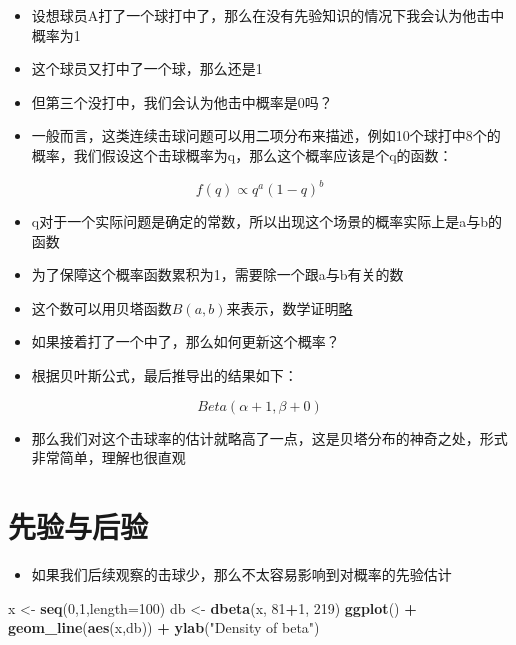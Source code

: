 \documentclass[]{book}
\newenvironment{Shaded}{\begin{snugshade}}{\end{snugshade}}
\newcommand{\DataTypeTok}[1]{\textcolor[rgb]{0.13,0.29,0.53}{#1}}
\newcommand{\DecValTok}[1]{\textcolor[rgb]{0.00,0.00,0.81}{#1}}
\newcommand{\KeywordTok}[1]{\textcolor[rgb]{0.13,0.29,0.53}{\textbf{#1}}}
\newcommand{\NormalTok}[1]{#1}
\newcommand{\OperatorTok}[1]{\textcolor[rgb]{0.81,0.36,0.00}{\textbf{#1}}}
\newcommand{\StringTok}[1]{\textcolor[rgb]{0.31,0.60,0.02}{#1}}
\providecommand{\tightlist}{%
  \setlength{\itemsep}{0pt}\setlength{\parskip}{0pt}}
\begin{document}
\begin{itemize}
\tightlist
\item
  设想球员A打了一个球打中了，那么在没有先验知识的情况下我会认为他击中概率为1
\item
  这个球员又打中了一个球，那么还是1
\item
  但第三个没打中，我们会认为他击中概率是0吗？
\item
  一般而言，这类连续击球问题可以用二项分布来描述，例如10个球打中8个的概率，我们假设这个击球概率为q，那么这个概率应该是个q的函数：
\end{itemize}

\[f(q) \propto q^a(1-q)^b\]

\begin{itemize}
\tightlist
\item
  q对于一个实际问题是确定的常数，所以出现这个场景的概率实际上是a与b的函数
\item
  为了保障这个概率函数累积为1，需要除一个跟a与b有关的数
\item
  这个数可以用贝塔函数\(B(a,b)\)来表示，数学证明\href{https://en.wikipedia.org/wiki/Conjugate_prior\#Example}{略}
\item
  如果接着打了一个中了，那么如何更新这个概率？
\item
  根据贝叶斯公式，最后推导出的结果如下：
\end{itemize}

\[Beta(\alpha+1,\beta+0)\]

\begin{itemize}
\tightlist
\item
  那么我们对这个击球率的估计就略高了一点，这是贝塔分布的神奇之处，形式非常简单，理解也很直观
\end{itemize}

\hypertarget{ux5148ux9a8cux4e0eux540eux9a8c}{%
\section{先验与后验}\label{ux5148ux9a8cux4e0eux540eux9a8c}}

\begin{itemize}
\tightlist
\item
  如果我们后续观察的击球少，那么不太容易影响到对概率的先验估计
\end{itemize}

\begin{Shaded}
\begin{Highlighting}[]
\NormalTok{x <-}\StringTok{ }\KeywordTok{seq}\NormalTok{(}\DecValTok{0}\NormalTok{,}\DecValTok{1}\NormalTok{,}\DataTypeTok{length=}\DecValTok{100}\NormalTok{)}
\NormalTok{db <-}\StringTok{ }\KeywordTok{dbeta}\NormalTok{(x, }\DecValTok{81}\OperatorTok{+}\DecValTok{1}\NormalTok{, }\DecValTok{219}\NormalTok{)}
\KeywordTok{ggplot}\NormalTok{() }\OperatorTok{+}\StringTok{ }\KeywordTok{geom_line}\NormalTok{(}\KeywordTok{aes}\NormalTok{(x,db)) }\OperatorTok{+}\StringTok{ }\KeywordTok{ylab}\NormalTok{(}\StringTok{"Density of beta"}\NormalTok{)}
\end{Highlighting}
\end{Shaded}
\end{document}
